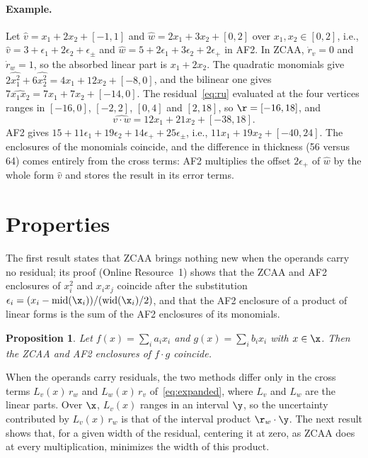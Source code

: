 \documentclass[10pt]{article}
\newcommand{\midp}{\mathrm{mid}}
\renewcommand{\wid}{\mathrm{wid}}
\newtheorem{propo}{Proposition}
\begin{document}
\paragraph{Example.} Let $\hat v=x_1+2x_2+[-1,1]$ and $\hat w=2x_1+3x_2+[0,2]$ over $x_1,x_2\in[0,2]$, i.e., $\hat v=3+\epsilon_1+2\epsilon_2+\epsilon_\pm$ and $\hat w=5+2\epsilon_1+3\epsilon_2+2\epsilon_+$ in AF2. In ZCAA, $\dot r_v=0$ and $\dot r_w=1$, so the absorbed linear part is $x_1+2x_2$. The quadratic monomials give $2\widehat{x_1^2}+6\widehat{x_2^2}=4x_1+12x_2+[-8,0]$, and the bilinear one gives $7\widehat{x_1x_2}=7x_1+7x_2+[-14,0]$. The residual~\eqref{eq:ru} evaluated at the four vertices ranges in $[-16,0]$, $[-2,2]$, $[0,4]$ and $[2,18]$, so $\r=[-16,18]$, and
\[
\widehat{v\cdot w}=12x_1+21x_2+[-38,18].
\]
AF2 gives $15+11\epsilon_1+19\epsilon_2+14\epsilon_++25\epsilon_\pm$, i.e., $11x_1+19x_2+[-40,24]$. The enclosures of the monomials coincide, and the difference in thickness (56 versus 64) comes entirely from the cross terms: AF2 multiplies the offset $2\epsilon_+$ of $\hat w$ by the whole form $\hat v$ and stores the result in its error terms.

\section{Properties}
\label{sec:properties}

The first result states that ZCAA brings nothing new when the operands carry no residual; its proof (Online Resource~1) shows that the ZCAA and AF2 enclosures of $x_i^2$ and $x_ix_j$ coincide after the substitution $\epsilon_i=(x_i-\midp(\x_i))/(\wid(\x_i)/2)$, and that the AF2 enclosure of a product of linear forms is the sum of the AF2 enclosures of its monomials.

\begin{propo}
\label{prop:af2}
Let $f(x)=\sum_i a_ix_i$ and $g(x)=\sum_i b_ix_i$ with $x\in\x$. Then the ZCAA and AF2 enclosures of $f\cdot g$ coincide.
\end{propo}

When the operands carry residuals, the two methods differ only in the cross terms $L_v(x)\,r_w$ and $L_w(x)\,r_v$ of~\eqref{eq:expanded}, where $L_v$ and $L_w$ are the linear parts. Over $\x$, $L_v(x)$ ranges in an interval $\y$, so the uncertainty contributed by $L_v(x)\,r_w$ is that of the interval product $\r_w\cdot\y$. The next result shows that, for a given width of the residual, centering it at zero, as ZCAA does at every multiplication, minimizes the width of this product.
\end{document}
